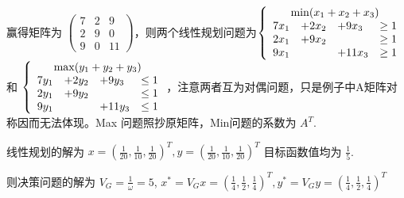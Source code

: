 \documentclass[UTF8, 6pt]{ctexart}
\begin{document}
赢得矩阵为 $\left(
\begin{array}{ccc}
7&2&9\\
2&9&0\\
9&0&11
\end{array}
\right)
$，则两个线性规划问题为$
\left\lbrace
\begin{array}{rlll}
	\multicolumn{4}{c}{\min(x_1+x_2+x_3)} \\
	7x_1 & +2x_2  & +9x_3  & \geq 1      \\
	2x_1 & + 9x_2 &        & \geq 1      \\
	9x_1 &        & +11x_3 & \geq1
\end{array}
\right.
$ 和 $
\left\lbrace
\begin{array}{rlll}
\multicolumn{4}{c}{\max(y_1+y_2+y_3)} \\
7y_1 & +2y_2  & +9y_3  & \leq 1      \\
2y_1 & + 9y_2 &        & \leq 1      \\
9y_1 &        & +11y_3 & \leq1
\end{array}
\right.
$，注意两者互为对偶问题，只是例子中A矩阵对称因而无法体现。Max 问题照抄原矩阵，Min问题的系数为 $A^T$.

线性规划的解为 $x = (\frac{1}{20}, \frac{1}{10}, \frac{1}{20})^T, y = (\frac{1}{20}, \frac{1}{10}, \frac{1}{20})^T$ 目标函数值均为 $\frac{1}{5}$.

则决策问题的解为 $V_G = \frac{1}{\omega} = 5$, $x^* = V_Gx = (\frac{1}{4}, \frac{1}{2}, \frac{1}{4})^T, y^* = V_Gy = (\frac{1}{4}, \frac{1}{2}, \frac{1}{4})^T$
\end{document}
